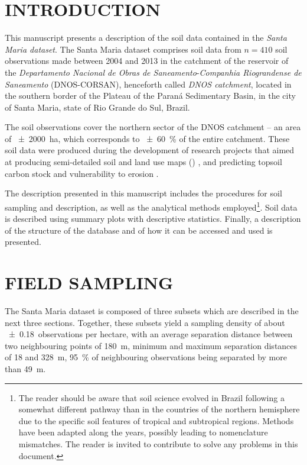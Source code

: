 \formatchapter

\section{INTRODUCTION}
\label{sec:chap04-introduction}

This manuscript presents a description of the soil data contained in the \emph{Santa Maria dataset}. The Santa 
Maria dataset comprises soil data from $n = 410$ soil observations made between \num{2004} and \num{2013} in 
the catchment of the reservoir of the \textit{Departamento Nacional de Obras de Saneamento}-\textit{Companhia 
Riograndense de Saneamento} (DNOS-CORSAN), henceforth called \emph{DNOS catchment}, located in the southern 
border of the Plateau of the Paraná Sedimentary Basin, in the city of Santa Maria, state of Rio Grande do Sul, 
Brazil.

The soil observations cover the northern sector of the DNOS catchment -- an area of \SI{\pm2000}{\hectare}, 
which corresponds to \SI{\pm60}{\percent} of the entire catchment. These soil data were produced during the 
development of research projects that aimed at producing semi-detailed soil and land use maps () 
\cite{Pedron2005, Miguel2010, SamuelRosaEtAl2011a, MiguelEtAl2012}, and predicting topsoil carbon stock and 
vulnerability to erosion \cite{Samuel-Rosa2009, MouraBueno2012, Miguel2013}.

\def\foottropics{\footnote{The reader should be aware that soil science evolved in Brazil following a somewhat 
different pathway than in the countries of the northern hemisphere due to the specific soil features of 
tropical and subtropical regions. Methods have been adapted along the years, possibly leading to nomenclature 
mismatches. The reader is invited to contribute to solve any problems in this document.}}

The description presented in this manuscript includes the procedures for soil sampling and description, as 
well as the analytical methods employed\foottropics{}. Soil data is described using summary plots with 
descriptive statistics. Finally, a description of the structure of the database and of how it can be accessed 
and used is presented. 

\section{FIELD SAMPLING}
\label{sec:chap04-sampling}

The Santa Maria dataset is composed of three subsets which are described in the next three sections. Together, 
these subsets yield a sampling density of about \num{\pm0.18}~observations per hectare, with an average 
separation distance between two neighbouring points of \SI{180}{\metre}, minimum and maximum separation 
distances of \num{18} and \SI{328}{\metre}, \SI{95}{\percent} of neighbouring observations being separated by 
more than \SI{49}{\metre}.

